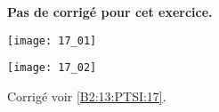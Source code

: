 \normalfalse \difficilefalse \tdifficiletrue
\correctionfalse


\setcounter{numques}{0}
\ifcorrection
\else
\textbf{Pas de corrigé pour cet exercice.}
\fi

\ifprof
\else

\begin{center}
\texttt{[image: 17\_01]}

\texttt{[image: 17\_02]}
\end{center}
\fi


\ifprof
\else
\fi


\ifprof
\else
\begin{flushright}
\footnotesize{Corrigé  voir \ref{B2:13:PTSI:17}.}
\end{flushright}%
\fi